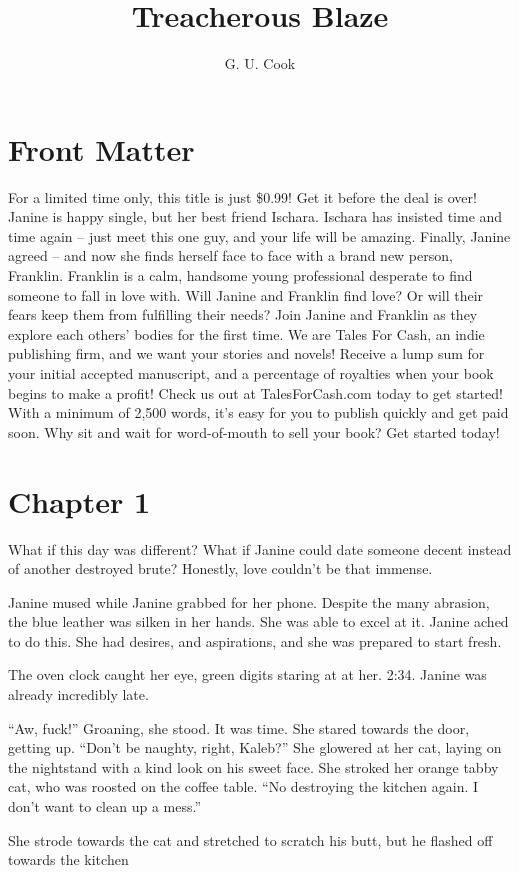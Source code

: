  \newline \title{Treacherous Blaze} \newline \author{G. U. Cook} \newline \newline \maketitle \par \par \chapter{Front Matter} \par  For a limited time only, this title is just \$0.99! Get it before the deal is over! Janine is happy single, but her best friend Ischara. Ischara has insisted time and time again -- just meet this one guy, and your life will be amazing. Finally, Janine agreed -- and now she finds herself face to face with a brand new person, Franklin. Franklin is a calm, handsome young professional desperate to find someone to fall in love with. Will Janine and Franklin find love? Or will their fears keep them from fulfilling their needs? Join Janine and Franklin as they explore each others' bodies for the first time. We are Tales For Cash, an indie publishing firm, and we want your stories and novels! Receive a lump sum for your initial accepted manuscript, and a percentage of royalties when your book begins to make a profit! Check us out at TalesForCash.com today to get started! With a minimum of 2,500 words, it's easy for you to publish quickly and get paid soon. Why sit and wait for word-of-mouth to sell your book? Get started today! \par \chapter{Chapter 1} \par  What if this day was different? What if Janine could date someone decent instead of another destroyed brute? Honestly, love couldn't be that immense. \par Janine mused while Janine grabbed for her phone. Despite the many abrasion, the blue leather was silken in her hands. She was able to excel at it. Janine ached to do this. She had desires, and aspirations, and she was prepared to start fresh. \par The oven clock caught her eye, green digits staring at at her. 2:34. Janine was already incredibly late. \par ``Aw, fuck!'' Groaning, she stood. It was time. She stared towards the door, getting up. ``Don't be naughty, right, Kaleb?'' She glowered at her cat, laying on the nightstand with a kind look on his sweet face.  She stroked her orange tabby cat, who was roosted on the coffee table. ``No destroying the kitchen again. I don't want to clean up a mess.'' \par She strode towards the cat and stretched to scratch his butt, but he flashed off towards the kitchen 